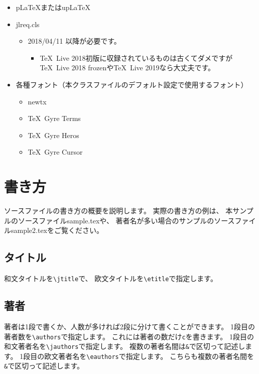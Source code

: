 \documentclass{FITpaper}
\begin{document}
\begin{itemize}
\item p\LaTeX またはup\LaTeX
\item jlreq.cls
  \begin{itemize}
  \item 2018/04/11 以降が必要です。
    \begin{itemize}
    \item \TeX~Live 2018初版に収録されているものは古くてダメですが
      \TeX~Live 2018 frozenや\TeX~Live 2019なら大丈夫です。
    \end{itemize}
  \end{itemize}
\item 各種フォント（本クラスファイルのデフォルト設定で使用するフォント）
  \begin{itemize}
  \item newtx
  \item \TeX~Gyre Terms
  \item \TeX~Gyre Heros
  \item \TeX~Gyre Cursor
  \end{itemize}
\end{itemize}

\section{書き方}

ソースファイルの書き方の概要を説明します。
実際の書き方の例は、
本サンプルのソースファイルsample.texや、
著者名が多い場合のサンプルのソースファイルsample2.texをご覧ください。

\subsection{タイトル}

和文タイトルを\texttt{\textbackslash jtitle}で、
欧文タイトルを\texttt{\textbackslash etitle}で指定します。

\subsection{著者}

著者は1段で書くか、人数が多ければ2段に分けて書くことができます。
1段目の著者数を\texttt{\textbackslash authors}で指定します。
これには著者の数だけ\texttt{c}を書きます。
1段目の和文著者名を\texttt{\textbackslash jauthors}で指定します。
複数の著者名間は\texttt{\&}で区切って記述します。
1段目の欧文著者名を\texttt{\textbackslash eauthors}で指定します。
こちらも複数の著者名間を\texttt{\&}で区切って記述します。
\end{document}
